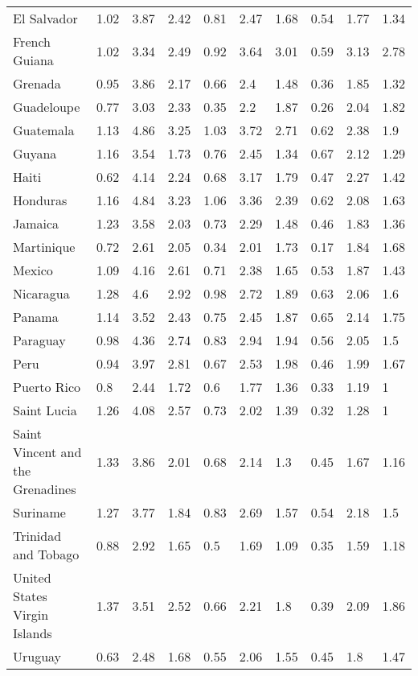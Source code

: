 \begin{longtable}[t]{llllllllll}
El Salvador & 1.02 & 3.87 & 2.42 & 0.81 & 2.47 & 1.68 & 0.54 & 1.77 & 1.34\\
French Guiana & 1.02 & 3.34 & 2.49 & 0.92 & 3.64 & 3.01 & 0.59 & 3.13 & 2.78\\
Grenada & 0.95 & 3.86 & 2.17 & 0.66 & 2.4 & 1.48 & 0.36 & 1.85 & 1.32\\
\addlinespace
Guadeloupe & 0.77 & 3.03 & 2.33 & 0.35 & 2.2 & 1.87 & 0.26 & 2.04 & 1.82\\
Guatemala & 1.13 & 4.86 & 3.25 & 1.03 & 3.72 & 2.71 & 0.62 & 2.38 & 1.9\\
Guyana & 1.16 & 3.54 & 1.73 & 0.76 & 2.45 & 1.34 & 0.67 & 2.12 & 1.29\\
Haiti & 0.62 & 4.14 & 2.24 & 0.68 & 3.17 & 1.79 & 0.47 & 2.27 & 1.42\\
Honduras & 1.16 & 4.84 & 3.23 & 1.06 & 3.36 & 2.39 & 0.62 & 2.08 & 1.63\\
\addlinespace
Jamaica & 1.23 & 3.58 & 2.03 & 0.73 & 2.29 & 1.48 & 0.46 & 1.83 & 1.36\\
Martinique & 0.72 & 2.61 & 2.05 & 0.34 & 2.01 & 1.73 & 0.17 & 1.84 & 1.68\\
Mexico & 1.09 & 4.16 & 2.61 & 0.71 & 2.38 & 1.65 & 0.53 & 1.87 & 1.43\\
Nicaragua & 1.28 & 4.6 & 2.92 & 0.98 & 2.72 & 1.89 & 0.63 & 2.06 & 1.6\\
Panama & 1.14 & 3.52 & 2.43 & 0.75 & 2.45 & 1.87 & 0.65 & 2.14 & 1.75\\
\addlinespace
Paraguay & 0.98 & 4.36 & 2.74 & 0.83 & 2.94 & 1.94 & 0.56 & 2.05 & 1.5\\
Peru & 0.94 & 3.97 & 2.81 & 0.67 & 2.53 & 1.98 & 0.46 & 1.99 & 1.67\\
Puerto Rico & 0.8 & 2.44 & 1.72 & 0.6 & 1.77 & 1.36 & 0.33 & 1.19 & 1\\
Saint Lucia & 1.26 & 4.08 & 2.57 & 0.73 & 2.02 & 1.39 & 0.32 & 1.28 & 1\\
Saint Vincent and the Grenadines & 1.33 & 3.86 & 2.01 & 0.68 & 2.14 & 1.3 & 0.45 & 1.67 & 1.16\\
\addlinespace
Suriname & 1.27 & 3.77 & 1.84 & 0.83 & 2.69 & 1.57 & 0.54 & 2.18 & 1.5\\
Trinidad and Tobago & 0.88 & 2.92 & 1.65 & 0.5 & 1.69 & 1.09 & 0.35 & 1.59 & 1.18\\
United States Virgin Islands & 1.37 & 3.51 & 2.52 & 0.66 & 2.21 & 1.8 & 0.39 & 2.09 & 1.86\\
Uruguay & 0.63 & 2.48 & 1.68 & 0.55 & 2.06 & 1.55 & 0.45 & 1.8 & 1.47\\

\end{longtable}
